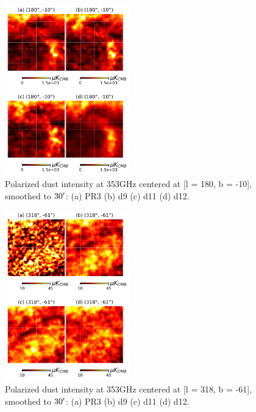 \documentclass[twocolumn]{aastex631}
\begin{document}
\begin{figure}[ht!]
    \centering
    \includegraphics[width=0.48\textwidth]{figures/pol_gal_plane_smooth_30'.png}
    \caption{Polarized dust intensity at 353GHz centered at [l = 180, b = -10], smoothed to $30\mbox{$^\prime$}$: (a) PR3 (b) d9 (c) d11 (d) d12.}
    \label{fig:353_pol_int_gal_plane}
\end{figure}

\begin{figure}[ht!]
    \centering
    \includegraphics[width=0.48\textwidth]{figures/pol_BK_smooth_30'.png}
    \caption{Polarized dust intensity at 353GHz centered at [l = 318, b = -61], smoothed to $30\mbox{$^\prime$}$: (a) PR3 (b) d9 (c) d11 (d) d12.}
    \label{fig:353_pol_int_BK}
\end{figure}
\end{document}
